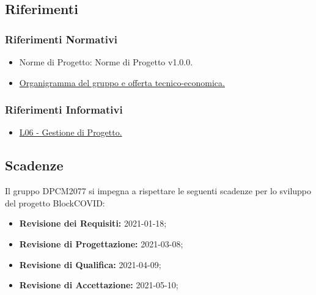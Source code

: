 \subsection{Riferimenti}
\subsubsection{Riferimenti Normativi}
\begin{itemize}
	\item Norme di Progetto: Norme di Progetto v1.0.0.
    \item \href{https://www.math.unipd.it/~tullio/IS-1/2020/Progetto/RO.html#Org}{Organigramma del gruppo e offerta tecnico-economica.}
\end{itemize}
\subsubsection{Riferimenti Informativi}
\begin{itemize}
	\item \href{https://www.math.unipd.it/~tullio/IS-1/2020/Dispense/L06.pdf}{L06 - Gestione di Progetto.}
\end{itemize}

\subsection{Scadenze}
Il gruppo DPCM2077 si impegna a rispettare le seguenti scadenze per lo sviluppo del progetto BlockCOVID:
\begin{itemize}
	\item \textbf{Revisione dei Requisiti:} 2021-01-18; \\
	\item \textbf{Revisione di Progettazione:} 2021-03-08; \\
	\item \textbf{Revisione di Qualifica:} 2021-04-09; \\
	\item \textbf{Revisione di Accettazione:} 2021-05-10; \\
\end{itemize}




